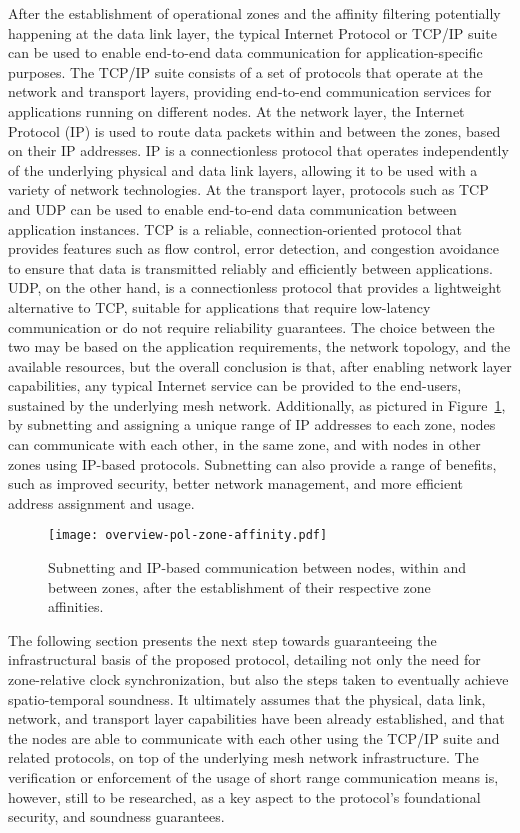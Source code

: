 After the establishment of operational zones and the affinity filtering potentially happening at the data link layer, the typical Internet Protocol or TCP/IP suite can be used to enable end-to-end data communication for application-specific purposes. The TCP/IP suite consists of a set of protocols that operate at the network and transport layers, providing end-to-end communication services for applications running on different nodes. At the network layer, the Internet Protocol (IP) is used to route data packets within and between the zones, based on their IP addresses. IP is a connectionless protocol that operates independently of the underlying physical and data link layers, allowing it to be used with a variety of network technologies. At the transport layer, protocols such as TCP and UDP can be used to enable end-to-end data communication between application instances. TCP is a reliable, connection-oriented protocol that provides features such as flow control, error detection, and congestion avoidance to ensure that data is transmitted reliably and efficiently between applications. UDP, on the other hand, is a connectionless protocol that provides a lightweight alternative to TCP, suitable for applications that require low-latency communication or do not require reliability guarantees. The choice between the two may be based on the application requirements, the network topology, and the available resources, but the overall conclusion is that, after enabling network layer capabilities, any typical Internet service can be provided to the end-users, sustained by the underlying mesh network. Additionally, as pictured in Figure~\ref{fig:proof-of-location-overview-pol-zone-affinity}, by subnetting and assigning a unique range of IP addresses to each zone, nodes can communicate with each other, in the same zone, and with nodes in other zones using IP-based protocols. Subnetting can also provide a range of benefits, such as improved security, better network management, and more efficient address assignment and usage.

\begin{figure}[h!]
    \begin{center}
    \texttt{[image: overview-pol-zone-affinity.pdf]}
    \caption{Subnetting and IP-based communication between nodes, within and between zones, after the establishment of their respective zone affinities.}
    \label{fig:proof-of-location-overview-pol-zone-affinity}
    \end{center}
\end{figure}

The following section presents the next step towards guaranteeing the infrastructural basis of the proposed \pol{} protocol, detailing not only the need for zone-relative clock synchronization, but also the steps taken to eventually achieve spatio-temporal soundness. It ultimately assumes that the physical, data link, network, and transport layer capabilities have been already established, and that the nodes are able to communicate with each other using the TCP/IP suite and related protocols, on top of the underlying mesh network infrastructure. The verification or enforcement of the usage of short range communication means is, however, still to be researched, as a key aspect to the protocol's foundational security, and soundness guarantees.